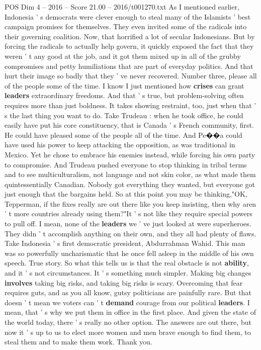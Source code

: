 \begin{textsample}{POS Dim 4 – 2016 – Score 21.00 – 2016/t001270.txt}
As I mentioned earlier, Indonesia ' s democrats were clever enough to steal many of the Islamists ' best campaign promises for themselves.
They even invited some of the radicals into their governing coalition.
Now, that horrified a lot of secular Indonesians.
But by forcing the radicals to actually help govern, it quickly exposed the fact that they weren ' t any good at the job, and it got them mixed up in all of the grubby compromises and petty humiliations that are part of everyday politics.
And that hurt their image so badly that they ' ve never recovered.
Number three, please all of the people some of the time.
I know I just mentioned how \textbf{crises} can grant \textbf{leaders} extraordinary freedoms.
And that ' s true, but problem-solving often requires more than just boldness.
It takes showing restraint, too, just when that ' s the last thing you want to do.
Take Trudeau : when he took office, he could easily have put his core constituency, that is Canada ' s French community, first.
He could have pleased some of the people all of the time.
And Pe{\EmojiFont �}{\EmojiFont �}a could have used his power to keep attacking the opposition, as was traditional in Mexico.
Yet he chose to embrace his enemies instead, while forcing his own party to compromise.
And Trudeau pushed everyone to stop thinking in tribal terms and to see multiculturalism, not language and not skin color, as what made them quintessentially Canadian.
Nobody got everything they wanted, but everyone got just enough that the bargains held.
So at this point you may be thinking,"OK, Tepperman, if the fixes really are out there like you keep insisting, then why aren ' t more countries already using them?"It ' s not like they require special powers to pull off.
I mean, none of the \textbf{leaders} we ' ve just looked at were superheroes.
They didn ' t accomplish anything on their own, and they all had plenty of flaws.
Take Indonesia ' s first democratic president, Abdurrahman Wahid.
This man was so powerfully uncharismatic that he once fell asleep in the middle of his own speech.
True story.
So what this tells us is that the real obstacle is not \textbf{ability}, and it ' s not circumstances.
It ' s something much simpler.
Making big changes \textbf{involves} taking big risks, and taking big risks is scary.
Overcoming that fear requires guts, and as you all know, gutsy politicians are painfully rare.
But that doesn ' t mean we voters can ' t \textbf{demand} courage from our political \textbf{leaders}.
I mean, that ' s why we put them in office in the first place.
And given the state of the world today, there ' s really no other option.
The answers are out there, but now it ' s up to us to elect more women and men brave enough to find them, to steal them and to make them work.
Thank you.

\end{textsample}
